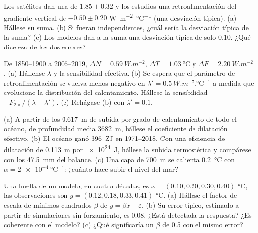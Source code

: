 \begin{exercise}[$\star\star$]\label{exo:b2:anthropogenic-climate-change:6}
Los satélites dan una  de $1.85 \pm 0.32$ y los estudios una retroalimentación del gradiente vertical de
$-0.50 \pm 0.20$ \unit{W.m^{-2}.\celsius^{-1}} (una desviación típica). (a) Hállese su suma.
(b) Si fueran independientes, ¿cuál sería la desviación típica de la suma? (c) Los modelos
dan a la suma una desviación típica de solo \num{0.10}. ¿Qué dice eso de los dos errores?
\end{exercise}

\begin{exercise}[$\star\star$]\label{exo:b2:anthropogenic-climate-change:7}
De 1850--1900 a 2006--2019, $\Delta N = \qty{0.59}{W.m^{-2}}$, $\Delta T = \qty{1.03}{\celsius}$
y $\Delta F = \qty{2.20}{W.m^{-2}}$. (a) Hállense $\lambda$ y la sensibilidad efectiva. (b) Se espera que el
parámetro de retroalimentación se vuelva menos negativo en $\lambda' = \qty{0.5}{W.m^{-2}.\celsius^{-1}}$
a medida que evolucione la distribución del calentamiento. Hállese la sensibilidad $-F_{2\times}/(\lambda + \lambda')$.
(c) Rehágase (b) con $\lambda' = 0.1$.
\end{exercise}

\begin{exercise}[$\star\star$]\label{exo:b2:anthropogenic-climate-change:8}
(a) A partir de los \qty{0.617}{m} de subida por grado de calentamiento de todo el océano, de profundidad media
\qty{3682}{m}, hállese el coeficiente de dilatación efectivo. (b) El océano ganó \qty{396}{ZJ} en
1971--2018. Con una eficiencia de dilatación de \qty{0.113}{m} por \qty{e24}{J}, hállese la subida termostérica
y compárese con los \qty{47.5}{mm} del balance. (c) Una capa de \qty{700}{m} se calienta
\qty{0.2}{\celsius} con $\alpha = \qty{2e-4}{\celsius^{-1}}$: ¿cuánto hace subir el nivel del mar?
\end{exercise}

\begin{exercise}[$\star\star$]\label{exo:b2:anthropogenic-climate-change:9}
Una huella de un modelo, en cuatro décadas, es $x = (0.10, 0.20, 0.30, 0.40)$ \unit{\celsius}; las
observaciones son $y = (0.12, 0.18, 0.33, 0.41)$ \unit{\celsius}. (a) Hállese el factor de escala de mínimos
cuadrados $\beta$ de $y = \beta x + \varepsilon$. (b) Su error típico, estimado a partir de simulaciones sin
forzamiento, es \num{0.08}. ¿Está detectada la respuesta? ¿Es coherente con el modelo? (c) ¿Qué
significaría un $\beta$ de 0.5 con el mismo error?
\end{exercise}

